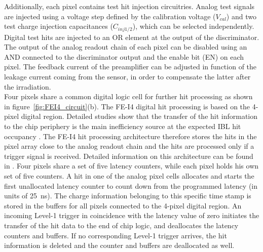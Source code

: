 Additionally, each pixel contains test hit injection circuitries. Analog test signals are injected using a voltage step defined by the calibration voltage ($V_{cal}$) and two test charge injection capacitances ($C_{inj1/2}$), which can be selected independently.%
Digital test hits are injected to an OR element at the output of the discriminator. The output of the analog readout chain of each pixel can be disabled using an AND connected to the discriminator output and the enable bit (EN) on each pixel. %
The feedback current of the preamplifier can be adjusted in function of the leakage current coming from the sensor, in order to compensate the latter after the irradiation.\\
Four pixels share a common digital logic cell for further hit processing as shown in figure~\ref{fig:FEI4_circuit}(b). The FE-I4 digital hit processing is based on the 4-pixel digital region. Detailed studies show that the transfer of the hit information to the chip periphery is the main inefficiency source at the expected IBL hit occupancy \cite{Malte_41}. The FE-I4 hit processing architecture therefore stores the hits in the pixel array close to the analog readout chain and the hits are processed only if a trigger signal is received. Detailed information on this architecture can be found in \cite{man_fei4b}. Four pixels share a set of five latency counters, while each pixel holds his own set of five \tot counters. A hit in one of the analog pixel cells allocates and starts the first unallocated latency counter to count down from the programmed latency (in units of \SI{25}{\nano\second}). The charge information belonging to this specific time stamp is stored in the buffers for all pixels connected to the 4-pixel digital region. An incoming Level-1 trigger in coincidence with the latency value of zero initiates the transfer of the hit data to the end of chip logic, and deallocates the latency counters and buffers. If no corresponding Level-1 trigger arrives, the hit information is deleted and the counter and buffers are deallocated as well.\\
